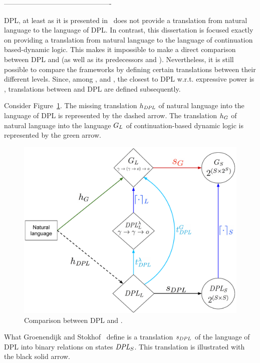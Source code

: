 ----------------------------------------------

DPL, at least as it is presented in~\cite{GroenendijkStokhof:1991:Dynamic-Predicate-Logic} does not provide a translation from natural language to the language of DPL. In contrast, this dissertation is focused exactly on providing a translation from natural language to the language of continuation based-dynamic logic. This makes it impossible to make a direct comparison between DPL and {\GLex} (as well as its predecessors {\GN} and {\GL}). Nevertheless, it is still possible to compare the frameworks by defining certain translations between their different levels. Since, among {\GN}, {\GL} and {\GLex}, the closest to DPL w.r.t. expressive power is {\GN}, translations between {\GN} and DPL are defined subsequently.

Consider Figure~\ref{DPLscheme}. The missing translation $h_{\textit{DPL}}$ of natural language into the language of DPL is represented by the dashed arrow. The translation $h_G$ of natural language into the language $G_L$ of continuation-based dynamic logic is represented by the green arrow.
 \begin{figure}[h!]
  \centering
    \includegraphics[width=1\textwidth]{images/DPLscheme.pdf}
      \caption{Comparison between DPL and {\GN}.} \label{DPLscheme}
\end{figure}

What Groenendijk and Stokhof~\cite{GroenendijkStokhof:1991:Dynamic-Predicate-Logic} define is a translation $s_{DPL}$ of the language of DPL into binary relations on states $\textit{DPL}_{S}$. This translation is illustrated with the black solid arrow.

